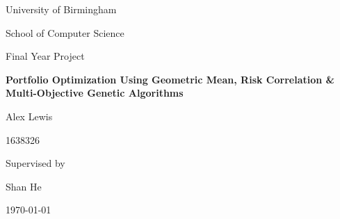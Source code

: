 \documentclass[11pt]{article}
\begin{document}
\begin{titlingpage}
    \centering\par
    {\huge University of Birmingham\par}
    {\small School of Computer Science\par}
        \vspace{0.8cm}
    {\Large Final Year Project\par}
        \vspace{0.8cm}
    {\Huge\bfseries Portfolio Optimization Using Geometric Mean, Risk Correlation 
        \& Multi-Objective Genetic Algorithms\par}
        \vspace{1.7cm}
    {\Large Alex Lewis\par}
    {\large 1638326 \par}
        \vspace{1cm}
    {\tiny Supervised by\par}
    {\Large Shan He\par}
        \vspace{0.7cm}
    {\large \today \par}
        \vspace{0.3cm}
        \hrulefill
        \vspace{0.3cm}
    \begin{abstract}
        \vspace{0.1cm}
        In modern portfolio theory an optimal portfolio of economic assets is one which balances
        risk and reward. An efficient portfolio cannot physically have higher return without
        increased risk. Portfolio optimization is the process of finding these
        efficient portfolios, and it's crucial from an investment standpoint
        so that an informed decision can be made as to how risky a portfolio
        is compared to its predicted return. An under explored area is risk
        evaluation. It is normally done using the Mean-Variance model, or
        value at risk. I propose a novel technique to find the correlation
        of assets inside a portfolio, and associating some mathematical
        value to this correlation. This set of calculations was applied
        from every asset to find the riskiness of a portfolio. Combining
        this with the classic return prediction of the geometric mean creates
        a multi-objective problem. This can then be efficiently solved
        using the latest iteration of genetic algorithms - NSGA-II.
        This more computer science oriented approach aims to tackle portfolio

\end{abstract}
\end{titlingpage}
\end{document}
